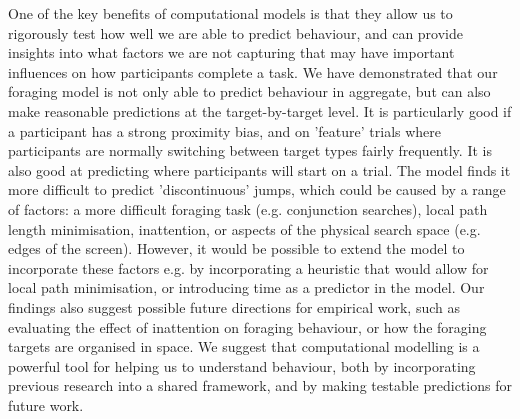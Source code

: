 \documentclass[preprints, article,submit,pdftex,moreauthors]{Definitions/mdpi}
\begin{document}
One of the key benefits of computational models is that they allow us to rigorously test how well we are able to predict behaviour, and can provide insights into what factors we are not capturing that may have important influences on how participants complete a task. We have demonstrated that our foraging model \cite{clarke2022foraging} is not only able to predict behaviour in aggregate, but can also make reasonable predictions at the target-by-target level. It is particularly good if a participant has a strong proximity bias, and on 'feature' trials where participants are normally switching between target types fairly frequently. It is also good at predicting where participants will start on a trial. The model finds it more difficult to predict 'discontinuous' jumps, which could be caused by a range of factors: a more difficult foraging task (e.g. conjunction searches), local path length minimisation, inattention, or aspects of the physical search space (e.g. edges of the screen). However, it would be possible to extend the model to incorporate these factors e.g. by incorporating a heuristic that would allow for local path minimisation, or introducing time as a predictor in the model. Our findings also suggest possible future directions for empirical work, such as evaluating the effect of inattention on foraging behaviour, or how the foraging targets are organised in space. We suggest that computational modelling is a powerful tool for helping us to understand behaviour, both by incorporating previous research into a shared framework, and by making testable predictions for future work.


\vspace{6pt} 



\end{document}
